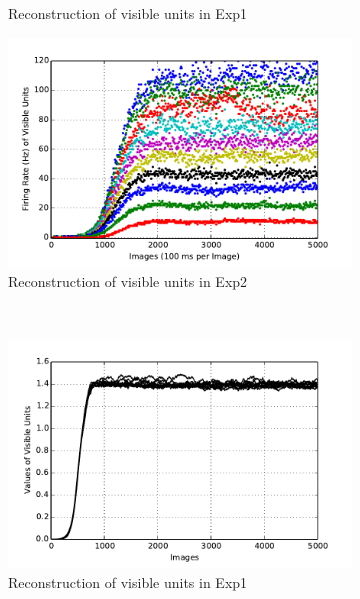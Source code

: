 \begin{figure}
\begin{subfigure}[t]{0.4\textwidth}
			\caption{Reconstruction of visible units in Exp1}
		\end{subfigure}
		\begin{subfigure}[t]{0.4\textwidth}
			\includegraphics[width=\textwidth]{pics_ae/exp2_recon_s.pdf}
			\caption{Reconstruction of visible units in Exp2}
		\end{subfigure}\\
		\begin{subfigure}[t]{0.4\textwidth}
			\includegraphics[width=\textwidth]{pics_ae/exp1_recon_nons.pdf}
			\caption{Reconstruction of visible units in Exp1}
		\end{subfigure}
		\begin{subfigure}[t]{0.4\textwidth}

\end{subfigure}
\end{figure}
